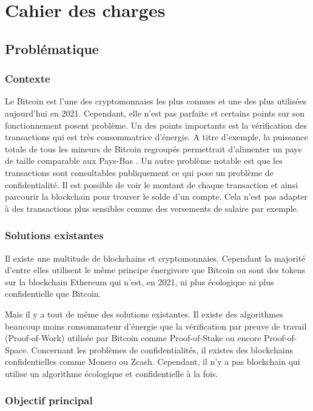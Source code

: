 \chapter{Cahier des charges}

\section*{Problématique}

\subsection*{Contexte}

Le Bitcoin est l'une des cryptomonnaies les plus connues et une des plus utilisées aujourd'hui en 2021. Cependant, elle n'est pas parfaite et certains points sur son fonctionnement posent problème. Un des points importants est la vérification des transactions qui est très consommatrice d'énergie. A titre d'exemple, la puissance totale de tous les mineurs de Bitcoin regroupés permettrait d'alimenter un pays de taille comparable aux Pays-Bas \cite{BTC_cons}. Un autre problème notable est que les transactions sont consultables publiquement ce qui pose un problème de confidentialité. Il est possible de voir le montant de chaque transaction et ainsi parcourir la blockchain pour trouver le solde d'un compte. Cela n'est pas adapter à des transactions plus sensibles comme des versements de salaire par exemple.

\subsection*{Solutions existantes}

Il existe une multitude de blockchains et cryptomonnaies. Cependant la majorité d'entre elles utilisent le même principe énergivore que Bitcoin ou sont des tokens sur la blockchain Ethereum qui n'est, en 2021, ni plus écologique ni plus confidentielle que Bitcoin.

Mais il y a tout de même des solutions existantes. Il existe des algorithmes beaucoup moins consommateur d'énergie que la vérification par preuve de travail (Proof-of-Work) utilisée par Bitcoin comme Proof-of-Stake ou encore Proof-of-Space. Concernant les problèmes de confidentialités, il existes des blockchains confidentielles comme Monero ou Zcash. Cependant, il n'y a pas blockchain qui utilise un algorithme écologique et confidentielle à la fois.

\subsection*{Objectif principal}


